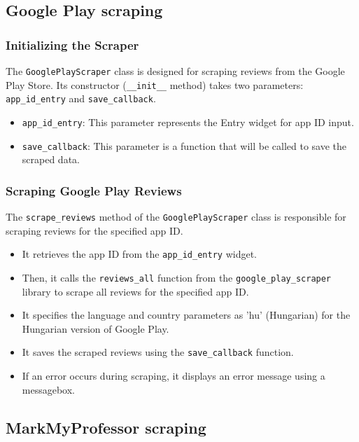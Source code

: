 \clearpage
\subsection{Google Play scraping}
\subsubsection*{Initializing the Scraper}
The \texttt{GooglePlayScraper} class is designed for scraping reviews from the Google Play Store. Its constructor (\texttt{\_\_init\_\_} method) takes two parameters: \texttt{app\_id\_entry} and \texttt{save\_callback}.

\begin{itemize}
    \item \texttt{app\_id\_entry}: This parameter represents the Entry widget for app ID input.
    \item \texttt{save\_callback}: This parameter is a function that will be called to save the scraped data.
\end{itemize}

\subsubsection*{Scraping Google Play Reviews}
The \texttt{scrape\_reviews} method of the \texttt{GooglePlayScraper} class is responsible for scraping reviews for the specified app ID.

\begin{itemize}
    \item It retrieves the app ID from the \texttt{app\_id\_entry} widget.
    \item Then, it calls the \texttt{reviews\_all} function from the \texttt{google\_play\_scraper} library to scrape all reviews for the specified app ID.
    \item It specifies the language and country parameters as 'hu' (Hungarian) for the Hungarian version of Google Play.
    \item It saves the scraped reviews using the \texttt{save\_callback} function.
    \item If an error occurs during scraping, it displays an error message using a messagebox.
\end{itemize}

\subsection{MarkMyProfessor scraping}
